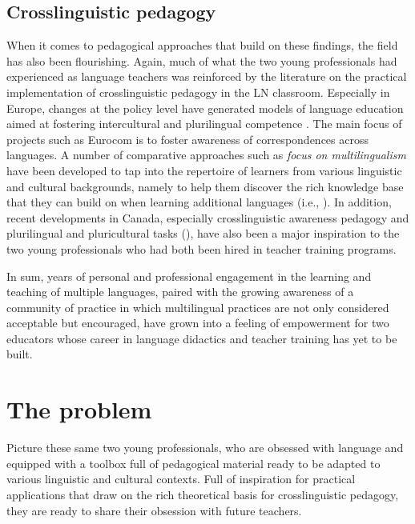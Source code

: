 \documentclass[output=paper]{../langscibook}
\begin{document}
\subsection{Crosslinguistic pedagogy}



When it comes to pedagogical approaches that build on these findings, the field has also been flourishing. Again, much of what the two young professionals had experienced as language teachers was reinforced by the literature on the practical implementation of crosslinguistic pedagogy in the LN classroom. Especially in Europe, changes at the policy level have generated models of language education aimed at fostering intercultural and plurilingual competence \citep{Candelier2007}. The main focus of projects such as Eurocom \citep{HufeisenMarx2007} is to foster awareness of correspondences across languages. A number of comparative approaches such as \emph{focus on multilingualism} \citep{CenozGorter2014} have been developed to tap into the repertoire of learners from various linguistic and cultural backgrounds, namely to help them discover the rich knowledge base that they can build on when learning additional languages (i.e., \citealt{LeonetEtAl2020}). In addition, recent developments in Canada, especially crosslinguistic awareness pedagogy \citep{HorstEtAl2010} and plurilingual and pluricultural tasks (\citealt{GalanteEtAl2019,GalanteEtAl2020}), have also been a major inspiration to the two young professionals who had both been hired in teacher training programs.

In sum, years of personal and professional engagement in the learning and teaching of multiple languages, paired with the growing awareness of a community of practice in which multilingual practices are not only considered acceptable but encouraged, have grown into a feeling of empowerment for two educators whose career in language didactics and teacher training has yet to be built.


\section{The problem}
Picture these same two young professionals, who are obsessed with language and equipped with a toolbox full of pedagogical material ready to be adapted to various linguistic and cultural contexts. Full of inspiration for practical applications that draw on the rich theoretical basis for crosslinguistic pedagogy, they are ready to share their obsession with future teachers. 
\end{document}
